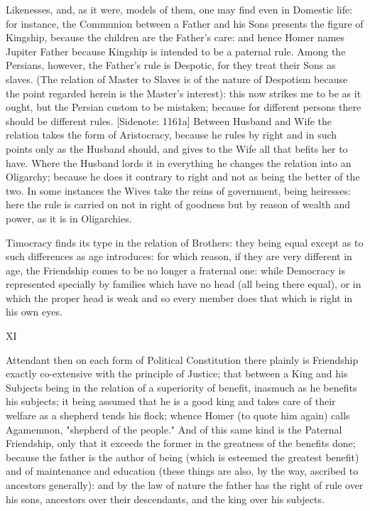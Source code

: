 Likenesses, and, as it were, models of them, one may find even in
Domestic life: for instance, the Communion between a Father and his Sons
presents the figure of Kingship, because the children are the Father's
care: and hence Homer names Jupiter Father because Kingship is intended
to be a paternal rule. Among the Persians, however, the Father's rule is
Despotic, for they treat their Sons as slaves. (The relation of Master
to Slaves is of the nature of Despotism because the point regarded
herein is the Master's interest): this now strikes me to be as it ought,
but the Persian custom to be mistaken; because for different persons
there should be different rules. [Sidenote: 1161a] Between Husband and
Wife the relation takes the form of Aristocracy, because he rules by
right and in such points only as the Husband should, and gives to
the Wife all that befits her to have. Where the Husband lords it in
everything he changes the relation into an Oligarchy; because he does
it contrary to right and not as being the better of the two. In some
instances the Wives take the reins of government, being heiresses: here
the rule is carried on not in right of goodness but by reason of wealth
and power, as it is in Oligarchies.

Timocracy finds its type in the relation of Brothers: they being equal
except as to such differences as age introduces: for which reason, if
they are very different in age, the Friendship comes to be no longer
a fraternal one: while Democracy is represented specially by families
which have no head (all being there equal), or in which the proper head
is weak and so every member does that which is right in his own eyes.


XI

Attendant then on each form of Political Constitution there plainly is
Friendship exactly co-extensive with the principle of Justice; that
between a King and his Subjects being in the relation of a superiority
of benefit, inasmuch as he benefits his subjects; it being assumed that
he is a good king and takes care of their welfare as a shepherd tends
his flock; whence Homer (to quote him again) calls Agamemnon, "shepherd
of the people." And of this same kind is the Paternal Friendship, only
that it exceeds the former in the greatness of the benefits done;
because the father is the author of being (which is esteemed the
greatest benefit) and of maintenance and education (these things are
also, by the way, ascribed to ancestors generally): and by the law of
nature the father has the right of rule over his sons, ancestors over
their descendants, and the king over his subjects.

